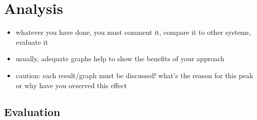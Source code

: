 \chapter{Analysis}
\begin{itemize}
	\item whatever you have done, you must comment it, compare it to other systems, evaluate it
	\item usually, adequate graphs help to show the benefits of your approach
	\item caution: each result/graph must be discussed! what's the reason for this peak or why have you ovserved this effect
\end{itemize}

\section{Evaluation}
